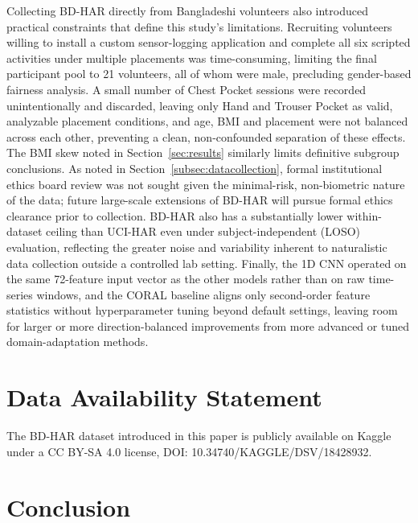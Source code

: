 \documentclass[conference]{IEEEtran}
\begin{document}
Collecting BD-HAR directly from Bangladeshi volunteers also introduced
practical constraints that define this study's limitations.
Recruiting volunteers willing to install a custom sensor-logging
application and complete all six scripted activities under multiple
placements was time-consuming, limiting the final participant pool to
21 volunteers, all of whom were male, precluding gender-based fairness
analysis. A small number of Chest Pocket sessions were recorded
unintentionally and discarded, leaving only Hand and Trouser Pocket as
valid, analyzable placement conditions, and age, BMI and placement
were not balanced across each other, preventing a clean,
non-confounded separation of these effects. The BMI skew noted in Section~\ref{sec:results} similarly limits definitive subgroup conclusions. As noted in Section~\ref{subsec:datacollection}, formal institutional ethics board
review was not sought given the minimal-risk, non-biometric nature of
the data; future large-scale extensions of BD-HAR will pursue formal
ethics clearance prior to collection. BD-HAR also has a substantially
lower within-dataset ceiling than UCI-HAR even under
subject-independent (LOSO) evaluation, reflecting the greater noise
and variability inherent to naturalistic data collection outside a
controlled lab setting. Finally, the 1D CNN operated on the same
72-feature input vector as the other models rather than on raw
time-series windows, and the CORAL baseline aligns only second-order
feature statistics without hyperparameter tuning beyond default
settings, leaving room for larger or more direction-balanced
improvements from more advanced or tuned domain-adaptation methods.

\section{Data Availability Statement}
The BD-HAR dataset introduced in this paper is publicly available on
Kaggle under a CC BY-SA 4.0 license, DOI:
10.34740/KAGGLE/DSV/18428932.

\section{Conclusion}
\label{sec:conclusion}
\end{document}
